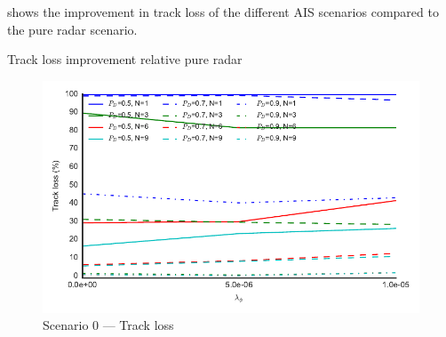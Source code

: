  shows the improvement in track loss of the different AIS scenarios compared to the pure radar scenario. 

\begin{table}[H]
\centering
{}
\caption{Track loss improvement relative pure radar}\label{tab:track_loss_improvement}
\end{table}

\begin{figure}
\centering
\includegraphics{Figures/plots/Scenario0_Tracking-TrackLoss.pdf}
\caption{Scenario 0 --- Track loss}\label{fig:scenario0_track_loss}
\end{figure}

